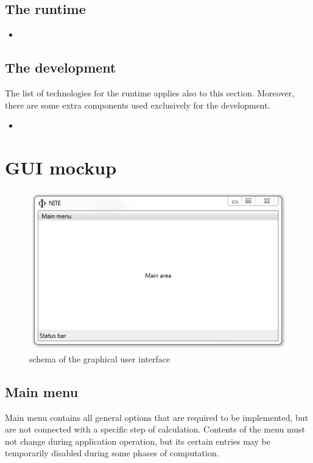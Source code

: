 \documentclass{article}
\begin{document}
\subsection{The runtime}

\begin{itemize}

  \item 

\end{itemize}

\subsection{The development}

The list of technologies for the runtime applies also to this section. Moreover, there are some
extra components used exclusively for the development.  

\begin{itemize}

  \item 

\end{itemize}

\newpage

\section{GUI mockup}

\begin{figure}[ht!]
  \centering
  \includegraphics[width=.5\textwidth]{../../graphics/PhiniteGuiMockup.png}
  \caption{schema of the graphical user interface}
\end{figure}

\subsection{Main menu}
Main menu contains all general options that are required to be implemented, but are not connected
with a specific step of calculation. Contents of the menu must not change during application
operation, but its certain entries may be temporarily disabled during some phases of computation.
\end{document}
